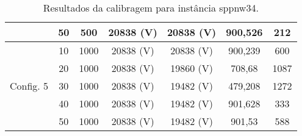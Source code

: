 \begin{table}[htbp]
\begin{tabular}{c|c|c|c|c|c|c}
          & 50    & 500   & 20838 (V) & 20838 (V) & 900,526 & 212 \\
    \hline
	\multirow{5}[8]{*}{Config. 5} & 10    & 1000  & 20838 (V) & 20838 (V) & 900,239 & 600 \\
          & 20    & 1000  & 20838 (V) & 19860 (V) & 708,68 & 1087 \\
          & 30    & 1000  & 20838 (V) & 19482 (V) & 479,208 & 1272 \\
          & 40    & 1000  & 20838 (V) & 19482 (V) & 901,628 & 333 \\
          & 50    & 1000  & 20838 (V) & 19482 (V) & 901,53 & 588 \\
    \bottomrule
    \end{tabular}%
  \label{tab:sppnw34}%
  \caption{Resultados da calibragem para instância sppnw34.}
\end{table}%
